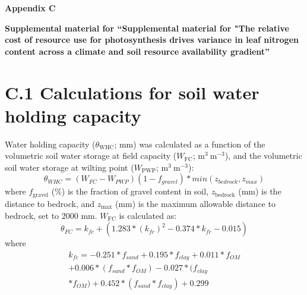 \newpage
\begin{center}
    \noindent \textbf{Appendix C}
\end{center}
\begin{center}
    \begin{singlespace}
        \textbf{Supplemental material for ``Supplemental material for "The relative cost of resource use for photosynthesis drives variance in leaf nitrogen content across a climate and soil resource availability gradient''}
    \end{singlespace}
\end{center}

\setcounter{table}{0}
\renewcommand{\thetable}{C\arabic{table}}

\setcounter{figure}{0}
\renewcommand{\thefigure}{C\arabic{figure}}


\section*{C.1 Calculations for soil water holding capacity}\label{appendix.c1}
\noindent Water holding capacity ($\theta_\mathrm{WHC}$; mm) was calculated as a function of the volumetric soil water storage at field capacity ($W_\mathrm{FC}$; $\mathrm{m^3\ m^{-3}}$), and the volumetric soil water storage at wilting point ($W_\mathrm{PWP}$; $\mathrm{m^3\ m^{-3}}$):
\begin{equation}
    \label{eqn_s4.1} \tag{C$_4$.1}
    \theta_{WHC} = (W_{FC}-W_{PWP})(1-f_{gravel}) * min(z_{bedrock}, z_{max})
\end{equation}
\noindent where $f_\mathrm{gravel}$ (\%) is the fraction of gravel content in soil, $z_\mathrm{bedrock}$ (mm) is the distance to bedrock, and $z_\mathrm{max}$ (mm) is the maximum allowable distance to bedrock, set to 2000 mm. $W_\mathrm{FC}$ is calculated as:
\begin{equation}
    \label{eqn_s4.2} \tag{C$_4$.2}
    \theta_{FC} = k_{fc}+(1.283*(k_{fc})^2-0.374*k_{fc}-0.015)
\end{equation}
\noindent where
\begin{equation}
    \label{eqn_s4.3} \tag{C$_4$.3}
    \begin{aligned}
        k_{fc}= -0.251 * f_{sand} + 0.195 * f_{clay} + 0.011 * f_{OM} \\ + 0.006 * (f_{sand} * f_{OM}) - 0.027 * (f_{clay} \\ * f_{OM}) + 0.452 * (f_{sand} * f_{clay}) + 0.299
    \end{aligned}	
\end{equation}
